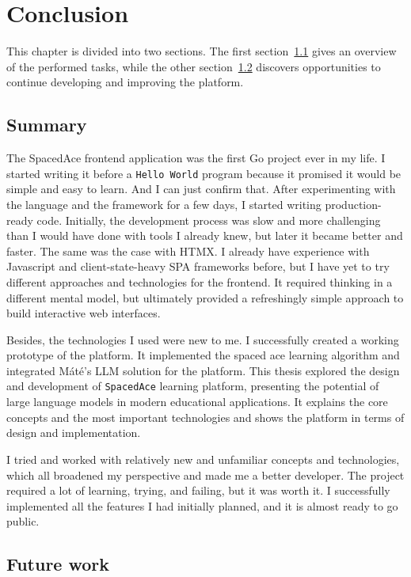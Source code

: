 \chapter{Conclusion}\label{ch:conclusion-and-future-work}

This chapter is divided into two sections. The first section~\ref{sec:summary} gives an overview of the performed tasks, while the other section~\ref{sec:future-work} discovers opportunities to continue developing and improving the platform.

\section{Summary}\label{sec:summary}

The SpacedAce frontend application was the first Go project ever in my life. I started writing it before a \texttt{Hello World} program because it promised it would be simple and easy to learn. And I can just confirm that. After experimenting with the language and the framework for a few days, I started writing production-ready code. Initially, the development process was slow and more challenging than I would have done with tools I already knew, but later it became better and faster. The same was the case with HTMX. I already have experience with Javascript and client-state-heavy SPA frameworks before, but I have yet to try different approaches and technologies for the frontend. It required thinking in a different mental model, but ultimately provided a refreshingly simple approach to build interactive web interfaces.

Besides, the technologies I used were new to me. I successfully created a working prototype of the platform. It implemented the spaced ace learning algorithm and integrated Máté's LLM solution for the platform. This thesis explored the design and development of \texttt{SpacedAce} learning platform, presenting the potential of large language models in modern educational applications. It explains the core concepts and the most important technologies and shows the platform in terms of design and implementation.

I tried and worked with relatively new and unfamiliar concepts and technologies, which all broadened my perspective and made me a better developer. The project required a lot of learning, trying, and failing, but it was worth it. I successfully implemented all the features I had initially planned, and it is almost ready to go public.

\section{Future work}\label{sec:future-work}

